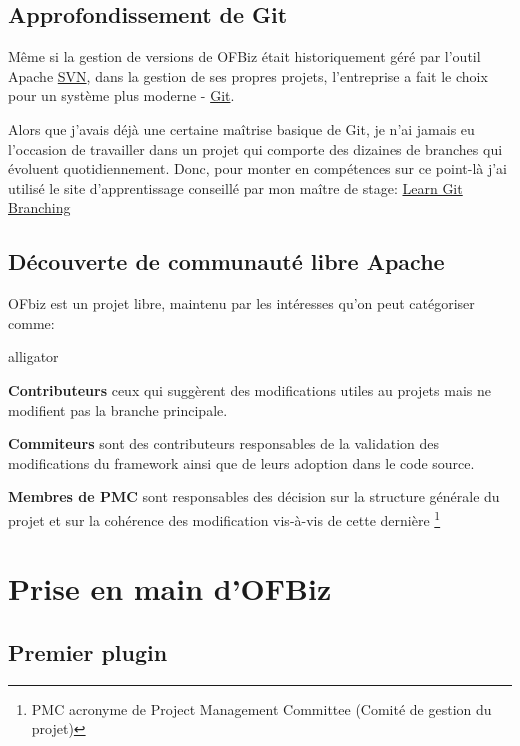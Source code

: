 \subsection{Approfondissement de Git }
Même si la gestion de versions de OFBiz était historiquement géré par l'outil Apache \href{https://subversion.apache.org/}{SVN}, dans la gestion de ses propres projets, l'entreprise a fait le choix pour un système plus moderne - \href{https://git-scm.com/}{Git}. 

Alors que j'avais déjà une certaine maîtrise basique de Git, je n'ai jamais eu l'occasion de travailler dans un projet qui comporte des dizaines de branches qui évoluent quotidiennement. Donc, pour monter en compétences sur ce point-là j'ai utilisé le site d'apprentissage conseillé par mon maître de stage: \href{https://learngitbranching.js.org/}{Learn Git Branching}

\subsection{Découverte de communauté libre Apache}
 OFbiz est un projet libre, maintenu par les intéresses qu'on peut catégoriser comme: 
 \begin{labeling}{alligator}
 	\item [\textbf{Contributeurs}] ceux qui suggèrent des modifications utiles au projets mais ne modifient pas la branche principale.
 	\item [\textbf{Commiteurs}] sont des contributeurs responsables de la validation des modifications du framework ainsi que de leurs adoption dans le code source. 
 	\item [\textbf{Membres de PMC}] sont responsables des décision  sur la structure  générale du projet et sur la cohérence des modification vis-à-vis de cette dernière  \footnote{PMC acronyme de Project Management Committee (Comité de gestion du projet)}
 \end{labeling}
 
 





\newpage




\section{Prise en main d'OFBiz}

\subsection{Premier plugin}

